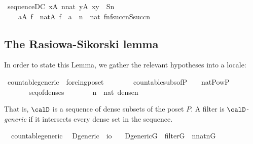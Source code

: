 \begin{isabelle}
\isamarkupfalse%
\ sequence{\isacharunderscore}DC{\isacharcolon}\ {\isachardoublequoteopen}{\isasymforall}x{\isasymin}A{\isachardot}\ {\isasymforall}n{\isasymin}nat{\isachardot}\ {\isasymexists}y{\isasymin}A{\isachardot}\ {\isasymlangle}x{\isacharcomma}y{\isasymrangle}\ {\isasymin}\ S{\isacharbackquote}n\ {\isasymLongrightarrow}\isanewline
\ \ \ \ {\isasymforall}a{\isasymin}A{\isachardot}\ {\isacharparenleft}{\isasymexists}f\ {\isasymin}\ nat{\isasymrightarrow}A{\isachardot}\ f{\isacharbackquote}{}\ {\isacharequal}\ a\ {\isasymand}\ {\isacharparenleft}{\isasymforall}n\ {\isasymin}\ nat{\isachardot}\ {\isasymlangle}f{\isacharbackquote}n{\isacharcomma}f{\isacharbackquote}succ{\isacharparenleft}n{\isacharparenright}{\isasymrangle}{\isasymin}S{\isacharbackquote}succ{\isacharparenleft}n{\isacharparenright}{\isacharparenright}{\isacharparenright}{\isachardoublequoteclose}
\end{isabelle}

\subsection{The Rasiowa-Sikorski lemma}\label{sec:rasiowa-sikorski-lemma}
In order to state this Lemma, we gather the relevant hypotheses into a locale:

\begin{isabelle}%
\isamarkupfalse%
\ countable{\isacharunderscore}generic\ {\isacharequal}\ forcing{\isacharunderscore}poset\ {\isacharplus}\isanewline
\ \ \ {\isasymD}\isanewline
\ \ \ countable{\isacharunderscore}subs{\isacharunderscore}of{\isacharunderscore}P{\isacharcolon}\ \ {\isachardoublequoteopen}{\isasymD}\ {\isasymin}\ nat{\isasymrightarrow}Pow{\isacharparenleft}P{\isacharparenright}{\isachardoublequoteclose}\isanewline
\ \ \ \ \ \ \ seq{\isacharunderscore}of{\isacharunderscore}denses{\isacharcolon}\ \ \ \ \ \ \ \ {\isachardoublequoteopen}{\isasymforall}n\ {\isasymin}\ nat{\isachardot}\ dense{\isacharparenleft}{\isasymD}{\isacharbackquote}n{\isacharparenright}{\isachardoublequoteclose}
\end{isabelle}
%
That is, $\calD$ is a sequence of dense subsets of the poset $P$. A
filter is \emph{$\calD$-generic} if it intersects every dense set in
the sequence.

\begin{isabelle}%
\isamarkupfalse%
\ {\isacharparenleft}\ countable{\isacharunderscore}generic{\isacharparenright}\isanewline
\ \ D{\isacharunderscore}generic\ {\isacharcolon}{\isacharcolon}\ {\isachardoublequoteopen}i{\isasymRightarrow}o{\isachardoublequoteclose}\ \isanewline
\ \ {\isachardoublequoteopen}D{\isacharunderscore}generic{\isacharparenleft}G{\isacharparenright}\ {\isacharequal}{\isacharequal}\ filter{\isacharparenleft}G{\isacharparenright}\ {\isasymand}\ {\isacharparenleft}{\isasymforall}n{\isasymin}nat{\isachardot}{\isacharparenleft}{\isasymD}{\isacharbackquote}n{\isacharparenright}{\isasyminter}G{\isasymnoteq}{}{\isacharparenright}{\isachardoublequoteclose}
\end{isabelle}

